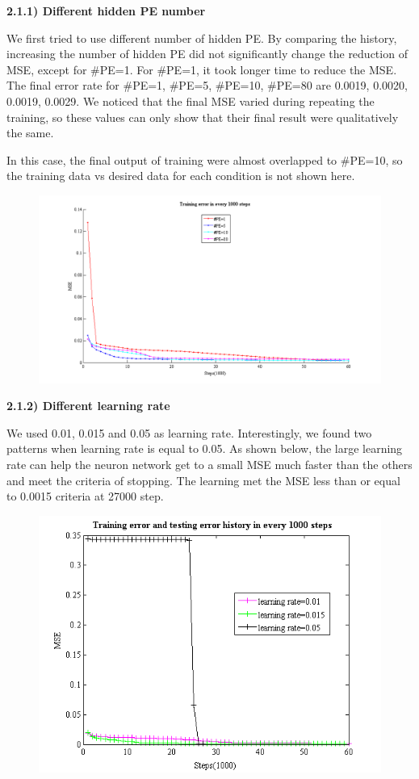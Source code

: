 \documentclass[epsfig]{article}
\def\bpar{\vskip26pt}
\def\npar{\vskip13pt}
\begin{document}
\clearpage

{\bf 
\npar
2.1.1) Different hidden PE number
\bpar
}

We first tried to use different number of hidden PE. By comparing the history, increasing the number of hidden PE did not significantly change the reduction of MSE, except for $\#$PE=1. For $\#$PE=1, it took longer time to reduce the MSE. The final error rate for $\#$PE=1, $\#$PE=5, $\#$PE=10, $\#$PE=80 are  0.0019, 0.0020, 0.0019, 0.0029. We noticed that the final MSE varied during repeating the training, so these values can only show that their final result were qualitatively the same.

In this case, the final output of training were almost overlapped to $\#$PE=10, so the training data vs desired data for each condition is not shown here.

\begin{figure}[!htb] 
\centering\includegraphics[width=6.5in]{errPE.png} 
\end{figure} 

\clearpage

{\bf 
\npar
2.1.2) Different learning rate
\bpar
}

We used 0.01, 0.015 and 0.05 as learning rate. Interestingly, we found two patterns when learning rate is equal to 0.05. As shown below, the large learning rate can help the neuron network get to a small MSE much faster than the others and meet the criteria of stopping. The learning met the MSE less than or equal to 0.0015 criteria at 27000 step.

\begin{figure}[!htb] 
\centering\includegraphics[width=4.5in]{lr_err1.png} 
\end{figure} 
\end{document}
